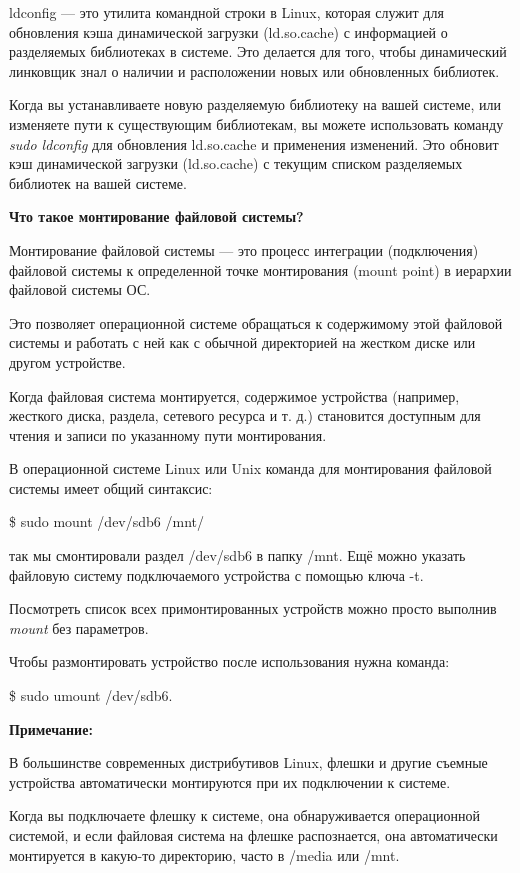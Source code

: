 \documentclass[oneside, final, 14pt]{extreport} %
\begin{document}
ldconfig --- это утилита командной строки в Linux, которая служит для обновления кэша динамической загрузки (ld.so.cache) с информацией о разделяемых библиотеках в системе. Это делается для того, чтобы динамический линковщик знал о наличии и расположении новых или обновленных библиотек. 

Когда вы устанавливаете новую разделяемую библиотеку на вашей системе, или изменяете пути к существующим библиотекам, вы можете использовать команду \textit{ sudo ldconfig} для обновления ld.so.cache и применения изменений. Это обновит кэш динамической загрузки (ld.so.cache) с текущим списком разделяемых библиотек на вашей системе.

\vspace*{\baselineskip}

\textbf{Что такое монтирование файловой системы?}

Монтирование файловой системы --- это процесс интеграции (подключения) файловой системы к определенной точке монтирования (mount point) в иерархии файловой системы ОС.

Это позволяет операционной системе обращаться к содержимому этой файловой системы и работать с ней как с обычной директорией на жестком диске или другом устройстве.

Когда файловая система монтируется, содержимое устройства (например, жесткого диска, раздела, сетевого ресурса и т. д.) становится доступным для чтения и записи по указанному пути монтирования.

В операционной системе Linux или Unix команда для монтирования файловой системы имеет общий синтаксис:

\$ sudo mount /dev/sdb6 /mnt/

так мы смонтировали раздел /dev/sdb6 в папку /mnt. 
Ещё можно указать файловую систему подключаемого устройства с помощью ключа -t. 

Посмотреть список всех примонтированных устройств можно просто выполнив \textit{mount} без параметров.

Чтобы размонтировать устройство после использования нужна команда:

\$ sudo umount /dev/sdb6.

\textbf{Примечание:}

В большинстве современных дистрибутивов Linux, флешки и другие съемные устройства автоматически монтируются при их подключении к системе. 

Когда вы подключаете флешку к системе, она обнаруживается операционной системой, и если файловая система на флешке распознается, она автоматически монтируется в какую-то директорию, часто в /media или /mnt.
\end{document}
